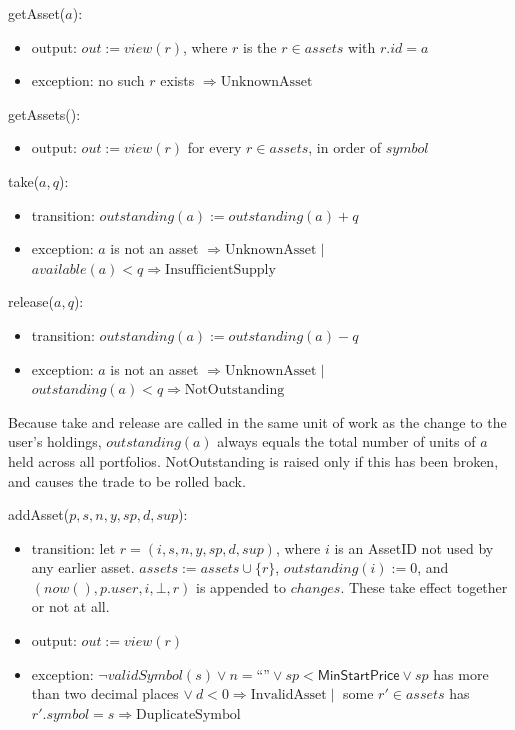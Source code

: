 \documentclass[12pt, titlepage]{article}
\begin{document}
\medskip

\noindent getAsset($a$):
\begin{itemize}
\item output: $\mathit{out} := \mathit{view}(r)$, where $r$ is the
  $r \in \mathit{assets}$ with $r.\mathit{id} = a$
\item exception: no such $r$ exists $\Rightarrow \mathrm{UnknownAsset}$
\end{itemize}

\noindent getAssets():
\begin{itemize}
\item output: $\mathit{out} := \mathit{view}(r)$ for every $r \in
  \mathit{assets}$, in order of $\mathit{symbol}$
\end{itemize}

\noindent take($a, q$):
\begin{itemize}
\item transition: $\mathit{outstanding}(a) := \mathit{outstanding}(a) + q$
\item exception: $a$ is not an asset $\Rightarrow \mathrm{UnknownAsset}
  \mid{}$ $\mathit{available}(a) < q \Rightarrow
  \mathrm{InsufficientSupply}$
\end{itemize}

\noindent release($a, q$):
\begin{itemize}
\item transition: $\mathit{outstanding}(a) := \mathit{outstanding}(a) - q$
\item exception: $a$ is not an asset $\Rightarrow \mathrm{UnknownAsset}
  \mid{}$ $\mathit{outstanding}(a) < q \Rightarrow \mathrm{NotOutstanding}$
\end{itemize}

\noindent Because take and release are called in the same unit of work as
the change to the user's holdings, $\mathit{outstanding}(a)$ always equals
the total number of units of $a$ held across all portfolios.
NotOutstanding is raised only if this has been broken, and causes the trade
to be rolled back.

\medskip

\noindent addAsset($p, s, n, y, \mathit{sp}, d, \mathit{sup}$):
\begin{itemize}
\item transition: let $r = (i, s, n, y, \mathit{sp}, d, \mathit{sup})$,
  where $i$ is an AssetID not used by any earlier asset. $\mathit{assets} :=
  \mathit{assets} \cup \{r\}$, $\mathit{outstanding}(i) := 0$, and
  $(\mathit{now}(), p.\mathit{user}, i, \bot, r)$ is appended to
  $\mathit{changes}$. These take effect together or not at all.
\item output: $\mathit{out} := \mathit{view}(r)$
\item exception: $\neg\mathit{validSymbol}(s) \vee n = \text{``''} \vee
  \mathit{sp} < \textsf{MinStartPrice} \vee \mathit{sp}$ has more than two
  decimal places $\vee\ d < 0 \Rightarrow \mathrm{InvalidAsset} \mid{}$
  some $r' \in \mathit{assets}$ has $r'.\mathit{symbol} = s \Rightarrow
  \mathrm{DuplicateSymbol}$
\end{itemize}
\end{document}
